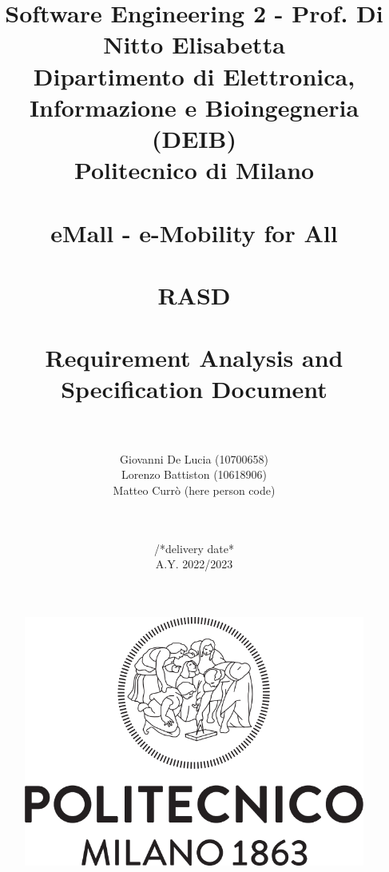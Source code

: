 \documentclass{article}
\title{
  {\small Software Engineering 2 - Prof. Di Nitto Elisabetta \\
  Dipartimento di Elettronica, Informazione e Bioingegneria (DEIB) \\ Politecnico di Milano} \\ \hfill \\
  \textbf{eMall - e-Mobility for All} \\ \hfill \\
  \large RASD \\ \hfill \\
    Requirement Analysis and Specification Document \\ \hfill \\}
\author{Giovanni De Lucia (10700658) \\ Lorenzo Battiston (10618906) \\  Matteo Currò (here person code) \\ \hfill \\}
\date{\hfill \\ /*delivery date* \\ A.Y. 2022/2023}
\begin{document}
\maketitle

\begin{figure}[h]
  \centering
  \includegraphics[scale=0.2]{src/Logo_Politecnico_Milano.png}
\end{figure}

\pagebreak

\tableofcontents







\end{document}
